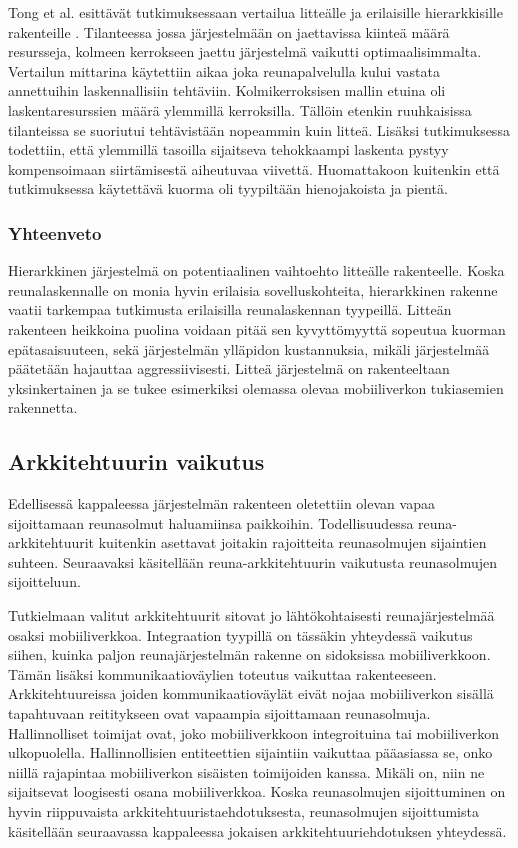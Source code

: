Tong et al. esittävät tutkimuksessaan vertailua litteälle ja erilaisille hierarkkisille rakenteille \cite{tong2016hierarchical}. Tilanteessa jossa järjestelmään on jaettavissa kiinteä määrä resursseja, kolmeen kerrokseen jaettu järjestelmä vaikutti optimaalisimmalta.
Vertailun mittarina käytettiin aikaa joka reunapalvelulla kului vastata annettuihin laskennallisiin tehtäviin. Kolmikerroksisen mallin etuina oli laskentaresurssien määrä ylemmillä kerroksilla. Tällöin etenkin ruuhkaisissa tilanteissa se suoriutui tehtävistään nopeammin kuin litteä. Lisäksi tutkimuksessa todettiin, että ylemmillä tasoilla sijaitseva tehokkaampi laskenta pystyy kompensoimaan siirtämisestä aiheutuvaa viivettä. Huomattakoon kuitenkin että tutkimuksessa käytettävä kuorma oli tyypiltään hienojakoista ja pientä. 


\subsubsection{Yhteenveto}
Hierarkkinen järjestelmä on potentiaalinen vaihtoehto litteälle rakenteelle. Koska reunalaskennalle on monia hyvin erilaisia sovelluskohteita, hierarkkinen rakenne vaatii tarkempaa tutkimusta erilaisilla reunalaskennan tyypeillä. Litteän rakenteen heikkoina puolina voidaan pitää sen kyvyttömyyttä sopeutua kuorman epätasaisuuteen, sekä järjestelmän ylläpidon kustannuksia, mikäli järjestelmää päätetään hajauttaa aggressiivisesti. Litteä järjestelmä on rakenteeltaan yksinkertainen ja se tukee esimerkiksi olemassa olevaa mobiiliverkon tukiasemien rakennetta. 


\subsection{Arkkitehtuurin vaikutus}
Edellisessä kappaleessa järjestelmän rakenteen oletettiin olevan vapaa sijoittamaan reunasolmut haluamiinsa paikkoihin. 
Todellisuudessa reuna-arkkitehtuurit kuitenkin asettavat joitakin rajoitteita reunasolmujen sijaintien suhteen. Seuraavaksi käsitellään reuna-arkkitehtuurin vaikutusta reunasolmujen sijoitteluun.

Tutkielmaan valitut arkkitehtuurit sitovat jo lähtökohtaisesti reunajärjestelmää osaksi mobiiliverkkoa. Integraation tyypillä on tässäkin yhteydessä vaikutus siihen, kuinka paljon reunajärjestelmän rakenne on sidoksissa mobiiliverkkoon.
Tämän lisäksi kommunikaatioväylien toteutus vaikuttaa rakenteeseen. 
Arkkitehtuureissa joiden kommunikaatioväylät eivät nojaa mobiiliverkon sisällä tapahtuvaan reititykseen ovat vapaampia sijoittamaan reunasolmuja. 
Hallinnolliset toimijat ovat, joko mobiiliverkkoon integroituina tai mobiiliverkon ulkopuolella. Hallinnollisien entiteettien sijaintiin vaikuttaa pääasiassa se, onko niillä rajapintaa mobiiliverkon sisäisten toimijoiden kanssa. Mikäli on, niin ne sijaitsevat loogisesti osana mobiiliverkkoa. 
Koska reunasolmujen sijoittuminen on hyvin riippuvaista arkkitehtuuristaehdotuksesta, reunasolmujen sijoittumista käsitellään seuraavassa kappaleessa jokaisen arkkitehtuuriehdotuksen yhteydessä.

